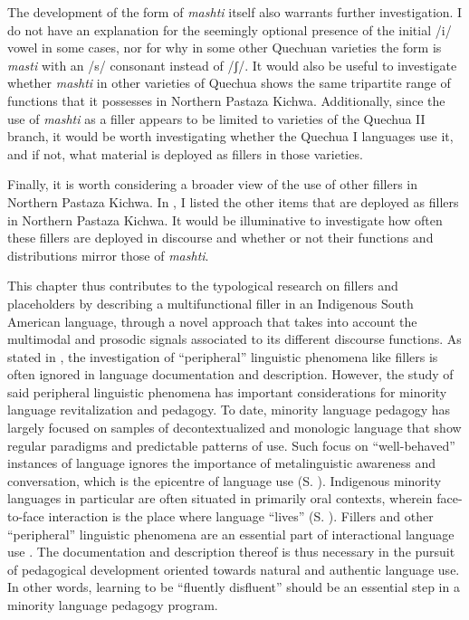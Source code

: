 \documentclass[output=paper]{langscibook}
\begin{document}
The development of the form of \textit{mashti} itself also warrants further investigation. I do not have an explanation for the seemingly optional presence of the initial /i/ vowel in some cases, nor for why in some other Quechuan varieties the form is \textit{masti} with an /s/ consonant instead of /ʃ/. It would also be useful to investigate whether \textit{mashti} in other varieties of Quechua shows the same tripartite range of functions that it possesses in Northern Pastaza Kichwa. Additionally, since the use of \textit{mashti} as a filler appears to be limited to varieties of the Quechua II branch, it would be worth investigating whether the Quechua I languages use it, and if not, what material is deployed as fillers in those varieties.

Finally, it is worth considering a broader view of the use of other fillers in Northern Pastaza Kichwa. In , I listed the other items that are deployed as fillers in Northern Pastaza Kichwa. It would be illuminative to investigate how often these fillers are deployed in discourse and whether or not their functions and distributions mirror those of \textit{mashti}. 

This chapter thus contributes to the typological research on fillers and placeholders by describing a multifunctional filler in an Indigenous South American language, through a novel approach that takes into account the multimodal and prosodic signals associated to its different discourse functions. As stated in , the investigation of “peripheral” linguistic phenomena like fillers is often ignored in language documentation and description. However, the study of said peripheral linguistic phenomena has important considerations for minority language revitalization and pedagogy. To date, minority language pedagogy has largely focused on samples of decontextualized and monologic language that show regular paradigms and predictable patterns of use. Such focus on “well-behaved” instances of language ignores the importance of metalinguistic awareness and conversation, which is the epicentre of language use (S. \citealt{Rice2021}). Indigenous minority languages in particular are often situated in primarily oral contexts, wherein face-to-face interaction is the place where language “lives” (S. \citealt{Rice2017}). Fillers and other “peripheral” linguistic phenomena are an essential part of interactional language use \citep{Ameka1992}. The documentation and description thereof is thus necessary in the pursuit of pedagogical development oriented towards natural and authentic language use. In other words, learning to be “fluently disfluent” should be an essential step in a minority language pedagogy program.
\end{document}
